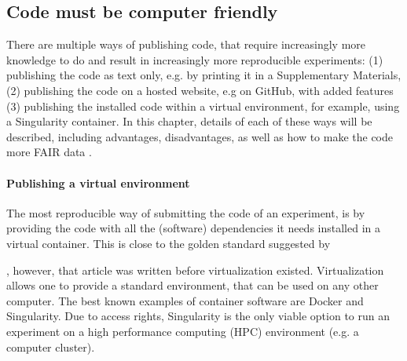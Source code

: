 \subsection{Code must be computer friendly}

There are multiple ways of publishing code,
that require increasingly more knowledge to do and result
in increasingly more reproducible experiments:
(1) publishing the code as text only, e.g. by printing
it in a Supplementary Materials, (2) publishing
the code on a hosted website, e.g on GitHub, with
added features (3) publishing 
the installed code within a virtual environment,
for example, using a Singularity container.
In this chapter, details of each of these ways will be described,
including advantages, disadvantages, as well as how to
make the code more FAIR data \cite{wilkinson2016fair}.

\paragraph{Publishing a virtual environment}

The most reproducible way of submitting the code of an experiment,
is by providing the code with all the (software) dependencies 
it needs installed in a virtual container.
This is close to the golden standard suggested by 
\cite{peng2011reproducible} 

,
however, that article was written before virtualization existed.
Virtualization allows one to provide a standard environment,
that can be used on any other computer.
The best known examples of container software are Docker and Singularity.
Due to access rights, Singularity is the only viable option to run
an experiment on a 
high performance computing (HPC) environment (e.g. a computer cluster).

